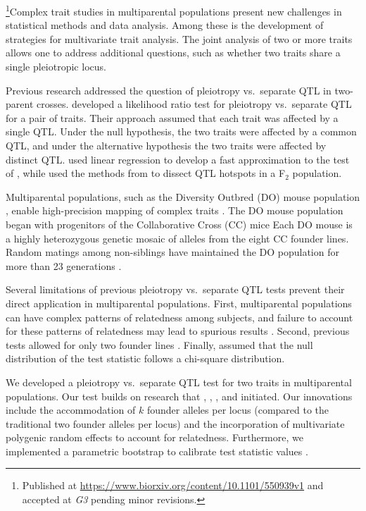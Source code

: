 \documentclass[oneside]{book}\usepackage[]{graphicx}\usepackage[]{color}
\begin{document}
\footnote{Published at \url{https://www.biorxiv.org/content/10.1101/550939v1} and accepted at \emph{G3} pending minor revisions.}Complex trait studies in multiparental populations present new
challenges in statistical methods and data analysis. Among these is
the development of strategies for multivariate trait analysis. The
joint analysis of two or more traits allows one to address additional
questions, such as whether two traits share a single pleiotropic
locus.




Previous research addressed the question of pleiotropy vs.\ separate
QTL in two-parent crosses.
\citet{jiang1995multiple} developed a likelihood
ratio test for pleiotropy vs.\ separate QTL for a pair of traits.
Their approach assumed that each trait was affected by a single QTL.
Under the null hypothesis, the two traits were affected by a common
QTL, and under the alternative hypothesis the two traits were affected
by distinct QTL.
\citet{knott2000multitrait} used linear regression to develop a fast
approximation to the test of \citet{jiang1995multiple}, while
\citet{tian2016dissection} used the methods from
\citet{knott2000multitrait} to dissect QTL hotspots in a F$_2$
population.


Multiparental populations, such
as the Diversity Outbred (DO) mouse population \citep{churchill2012diversity}, enable high-precision
mapping of complex traits \citep{de2014genetics}. The DO
mouse population began with progenitors of the Collaborative
Cross (CC) mice \citep{churchill2004collaborative}
Each DO mouse is a highly heterozygous genetic mosaic
of alleles from the eight CC founder lines. Random
matings among non-siblings have maintained the DO
population for more than 23 generations \citep{chesler2016diversity}.

Several limitations of previous pleiotropy vs.\ separate QTL tests
prevent their direct application in multiparental populations. First,
multiparental populations can have complex patterns of relatedness
among subjects, and failure to account for these patterns of
relatedness may lead to spurious results \citep{yang2014advantages}.
Second, previous tests allowed for only two founder lines
\citep{jiang1995multiple}. Finally, \citet{jiang1995multiple} assumed
that the null distribution of the test statistic follows a chi-square
distribution.

We developed a pleiotropy vs.\ separate QTL test for two traits in
multiparental populations. Our test builds on research that
\citet{jiang1995multiple}, \citet{knott2000multitrait},
\citet{tian2016dissection}, and \citet{zhou2014efficient} initiated.
Our innovations include the accommodation of $k$ founder alleles per
locus (compared to the traditional two founder alleles per locus) and
the incorporation of multivariate polygenic random effects to account
for relatedness. Furthermore, we implemented a parametric bootstrap to
calibrate test statistic values \citep{efron1979,tian2016dissection}.
\end{document}
